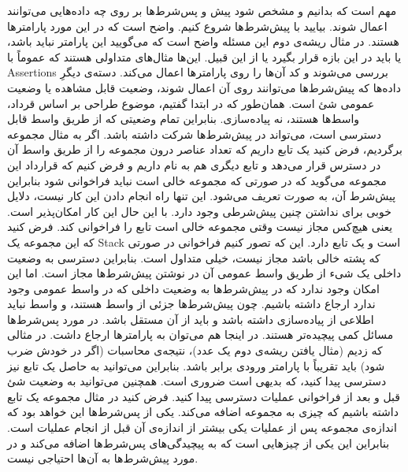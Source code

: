 مهم است که بدانیم و مشخص شود پیش و پس‌شرط‌ها بر روی چه داده‌هایی می‌توانند اعمال شوند. بیایید با پیش‌شرط‌ها شروع کنیم. واضح است که در این مورد پارامترها هستند. در مثال ریشه‌ی دوم این مسئله واضح است که می‌گویید این پارامتر نباید 
باشد، یا باید در این بازه قرار بگیرد یا از این قبیل. این‌ها مثال‌های متداولی هستند که عموماً با 
\glspl{Assertion}
بررسی می‌شوند و کد آن‌ها را روی پارامترها اعمال می‌کند. دسته‌ی دیگرِ داده‌ها که پیش‌شرط‌ها می‌توانند روی آن اعمال شوند، وضعیت قابل مشاهده یا وضعیت عمومی شئ است. همان‌طور که در ابتدا گفتیم، موضوع طراحی بر اساس قرداد، واسط‌ها هستند، نه پیاده‌سازی. بنابراین تمام وضعیتی که از طریق واسط قابل دسترسی است، می‌تواند در پیش‌شرط‌ها شرکت داشته باشد. اگر به مثال مجموعه برگردیم، فرض کنید یک تابع 
داریم که تعداد عناصر درون مجموعه را از طریق واسط آن در دسترس قرار می‌دهد و تابع دیگری هم به نام
داریم و فرض کنیم که قرارداد این مجموعه می‌گوید که در صورتی که مجموعه خالی است
نباید فراخوانی شود بنابراین پیش‌شرط آن، به صورت
تعریف می‌شود. این تنها راه انجام دادن این کار نیست، دلایل خوبی برای نداشتن چنین پیش‌شرطی وجود دارد. با این حال این کار امکان‌پذیر است. یعنی هیچ‌کس مجاز نیست وقتی مجموعه خالی است تابع
را فراخوانی کند. فرض کنید که این مجموعه یک
\gls{Stack}
است و یک تابع
دارد. این که تصور کنیم فراخوانی
در صورتی که پشته خالی باشد مجاز نیست، خیلی متداول است. بنابراین دسترسی به وضعیت داخلی یک شیء از طریق واسط عمومی آن در نوشتن پیش‌شرط‌ها مجاز است. اما این امکان وجود ندارد که در پیش‌شرط‌ها به وضعیت داخلی که در واسط عمومی وجود ندارد ارجاع داشته باشیم. چون پیش‌شرط‌ها جزئی از واسط هستند، و واسط نباید اطلاعی از پیاده‌سازی داشته باشد و باید از آن مستقل باشد.
در مورد پس‌شرط‌ها مسائل کمی پیچیده‌تر هستند. در اینجا هم می‌توان به پارامترها ارجاع داشت. در مثالی که زدیم (مثال یافتن ریشه‌ی دوم یک عدد)، نتیجه‌ی محاسبات (اگر در خودش ضرب شود) باید تقریباً با پارامتر ورودی برابر باشد. بنابراین می‌توانید به حاصل یک تابع نیز دسترسی پیدا کنید، که بدیهی است ضروری است. همچنین می‌توانید به وضعیت شئ قبل و بعد از فراخوانی عملیات دسترسی پیدا کنید. فرض کنید در مثال مجموعه یک تابع
داشته باشیم که چیزی به مجموعه اضافه می‌کند. یکی از پس‌شرط‌ها این خواهد بود که اندازه‌ی مجموعه پس از عملیات یکی بیشتر از اندازه‌ی آن قبل از انجام عملیات است. بنابراین این یکی از چیزهایی است که به پیچیدگی‌های پس‌شرط‌ها اضافه می‌کند و در مورد پیش‌شرط‌ها به آن‌ها احتیاجی نیست.
